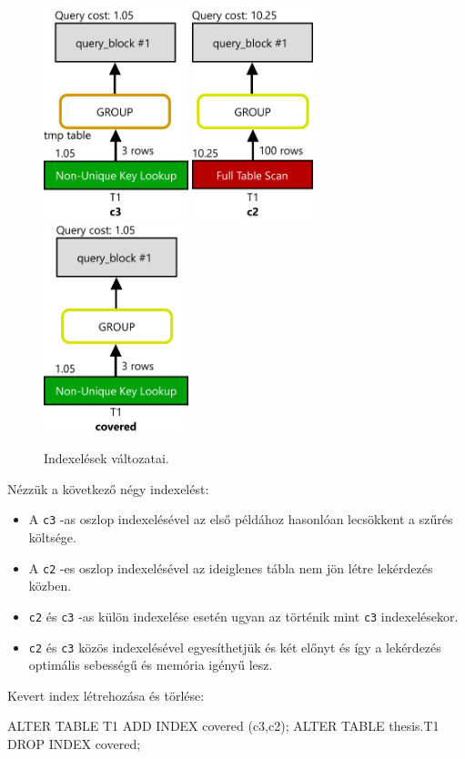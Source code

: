 \begin{figure}[h!]
\centering
\includegraphics[width=4.2cm]{images/explain/2-4.png}
\hspace{1cm} 
\includegraphics[width=3.51cm]{images/explain/2-2.png}
\hspace{1cm} 
\includegraphics[width=4.2cm]{images/explain/covered.png}
\caption{Indexelések változatai.}
\label{fig:schema}
\end{figure}

Nézzük a következő négy indexelést:
\begin{itemize} 
\item A \texttt{c3} -as oszlop indexelésével az első példához hasonlóan lecsökkent a szűrés költsége.
\item A \texttt{c2} -es oszlop indexelésével az ideiglenes tábla nem jön létre lekérdezés közben.
\item \texttt{c2} és \texttt{c3} -as külön indexelése esetén ugyan az történik mint \texttt{c3} indexelésekor.
\item \texttt{c2} és \texttt{c3} közös indexelésével egyesíthetjük és két előnyt és így a lekérdezés optimális sebességű és memória igényű lesz.
\end{itemize} 
Kevert index létrehozása és törlése:
\begin{python}
ALTER TABLE T1 ADD INDEX covered (c3,c2);
ALTER TABLE thesis.T1 DROP INDEX covered;
\end{python}

